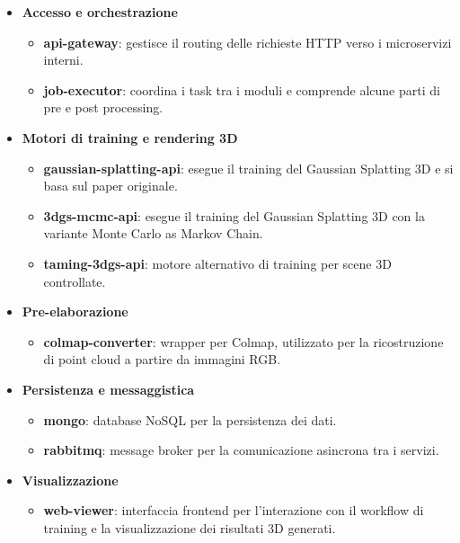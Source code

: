 \begin{itemize}
	\item \textbf{Accesso e orchestrazione}
	\begin{itemize}
		\item \textbf{api-gateway}: gestisce il routing delle richieste HTTP verso i microservizi interni.
		\item \textbf{job-executor}: coordina i task tra i moduli e comprende alcune parti di pre e post processing.
	\end{itemize}
	
	\item \textbf{Motori di training e rendering 3D}
	\begin{itemize}
		\item \textbf{gaussian-splatting-api}: esegue il training del Gaussian Splatting 3D e si basa sul paper originale.
		\item \textbf{3dgs-mcmc-api}: esegue il training del Gaussian Splatting 3D con la variante Monte Carlo as Markov Chain.
		\item \textbf{taming-3dgs-api}: motore alternativo di training per scene 3D controllate.
	\end{itemize}
	
	\item \textbf{Pre-elaborazione}
	\begin{itemize}
		\item \textbf{colmap-converter}: wrapper per Colmap, utilizzato per la ricostruzione di point cloud a partire da immagini RGB.
	\end{itemize}
	
	\item \textbf{Persistenza e messaggistica}
	\begin{itemize}
		\item \textbf{mongo}: database NoSQL per la persistenza dei dati.
		\item \textbf{rabbitmq}: message broker per la comunicazione asincrona tra i servizi.
	\end{itemize}
	
	\item \textbf{Visualizzazione}
	\begin{itemize}
		\item \textbf{web-viewer}: interfaccia frontend per l'interazione con il workflow di training e la visualizzazione dei risultati 3D generati.
	\end{itemize}
\end{itemize}

